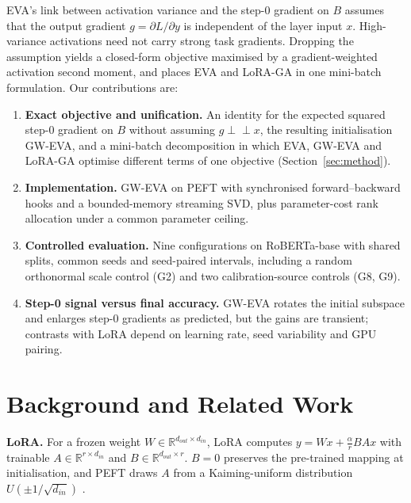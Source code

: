 \documentclass[letterpaper]{article} %
\begin{document}
EVA's link between activation variance and the step-0 gradient on $B$ assumes that the output gradient $g=\partial L/\partial y$ is independent of the layer input $x$. High-variance activations need not carry strong task gradients. Dropping the assumption yields a closed-form objective maximised by a gradient-weighted activation second moment, and places EVA and LoRA-GA in one mini-batch formulation. Our contributions are:
\begin{enumerate}
\item \textbf{Exact objective and unification.} An identity for the expected squared step-0 gradient on $B$ without assuming $g \perp\!\!\!\perp x$, the resulting initialisation GW-EVA, and a mini-batch decomposition in which EVA, GW-EVA and LoRA-GA optimise different terms of one objective (Section~\ref{sec:method}).
\item \textbf{Implementation.} GW-EVA on PEFT \citep{mangrulkar2022peft} with synchronised forward--backward hooks and a bounded-memory streaming SVD, plus parameter-cost rank allocation under a common parameter ceiling.
\item \textbf{Controlled evaluation.} Nine configurations on RoBERTa-base with shared splits, common seeds and seed-paired intervals, including a random orthonormal scale control (G2) and two calibration-source controls (G8, G9).
\item \textbf{Step-0 signal versus final accuracy.} GW-EVA rotates the initial subspace and enlarges step-0 gradients as predicted, but the gains are transient; contrasts with LoRA depend on learning rate, seed variability and GPU pairing.
\end{enumerate}

\section{Background and Related Work}

\textbf{LoRA.} For a frozen weight $W\in\mathbb{R}^{d_{out}\times d_{in}}$, LoRA computes $y=Wx+\frac{\alpha}{r}BAx$ with trainable $A\in\mathbb{R}^{r\times d_{in}}$ and $B\in\mathbb{R}^{d_{out}\times r}$. $B=0$ preserves the pre-trained mapping at initialisation, and PEFT draws $A$ from a Kaiming-uniform distribution $U(\pm 1/\sqrt{d_{in}})$ \citep{he2015delving}.
\end{document}
